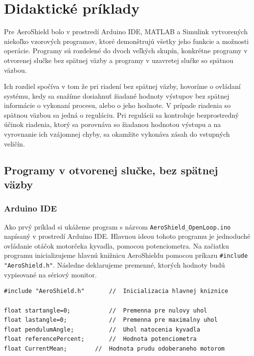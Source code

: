 \chapter{Didaktické príklady}
\label{Didaktické príklady}

Pre AeroShield bolo v prostredí Arduino IDE, MATLAB a Simulink vytvorených niekoľko vzorových programov, ktoré demonštrujú všetky jeho funkcie a možnosti operácie. Programy sú rozdelené do dvoch veľkých skupín, konkrétne programy v otvorenej slučke bez spätnej väzby a programy v uzavretej slučke so spätnou väzbou. 

Ich rozdiel spočíva v tom že pri riadení bez spätnej väzby, hovoríme o ovládaní systému, kedy sa snažíme dosiahnuť žiadané hodnoty výstupov bez spätnej informácie o vykonaní procesu, alebo o jeho hodnote. V prípade riadenia so spätnou väzbou sa jedná o reguláciu. Pri regulácii sa kontroluje bezprostredný účinok riadenia, ktorý sa porovnáva so žiadanou hodnotou výstupu a na vyrovnanie ich vzájomnej chyby, sa okamžite vykonáva zásah do vstupných veličín. 

\section{Programy v otvorenej slučke, bez spätnej väzby}
\subsection{Arduino IDE}

Ako prvý príklad si ukážeme program s názvom \verb|AeroShield_OpenLoop.ino| napísaný v prostredí Arduino IDE. Hlavnou ideou tohoto programu je jednoduché ovládanie otáčok motorčeka kyvadla, pomocou potenciometra. Na začiatku programu inicializujeme hlavnú knižnicu AeroShieldu pomocou príkazu \verb|#include "AeroShield.h"|. Následne deklarujeme premenné, ktorých hodnoty budú vypisované na sériový monitor. 

\begin{lstlisting}[caption={AeroShield open loop dekleracia.},captionpos=b]
#include "AeroShield.h"       //  Inicializacia hlavnej kniznice

float startangle=0;           //  Premenna pre nulovy uhol
float lastangle=0;            //  Premenna pre maximalny uhol 
float pendulumAngle;          //  Uhol natocenia kyvadla
float referencePercent;       //  Hodnota potenciometra
float CurrentMean;	      //  Hodnota prudu odoberaneho motorom 
\end{lstlisting}

